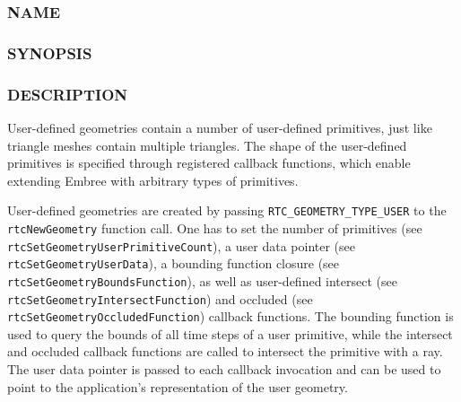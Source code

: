 \subsubsection{NAME}\label{name}

\begin{Shaded}
\begin{Highlighting}[]
\OperatorTok{{-}}
\end{Highlighting}
\end{Shaded}

\subsubsection{SYNOPSIS}\label{synopsis}

\begin{Shaded}
\begin{Highlighting}[]

\OperatorTok{=}
\OperatorTok{(}\OperatorTok{,}\OperatorTok{);}
\end{Highlighting}
\end{Shaded}

\subsubsection{DESCRIPTION}\label{description}

User-defined geometries contain a number of user-defined primitives,
just like triangle meshes contain multiple triangles. The shape of the
user-defined primitives is specified through registered callback
functions, which enable extending Embree with arbitrary types of
primitives.

User-defined geometries are created by passing
\texttt{RTC\_GEOMETRY\_TYPE\_USER} to the \texttt{rtcNewGeometry}
function call. One has to set the number of primitives (see
\texttt{rtcSetGeometryUserPrimitiveCount}), a user data pointer (see
\texttt{rtcSetGeometryUserData}), a bounding function closure (see
\texttt{rtcSetGeometryBoundsFunction}), as well as user-defined
intersect (see \texttt{rtcSetGeometryIntersectFunction}) and occluded
(see \texttt{rtcSetGeometryOccludedFunction}) callback functions. The
bounding function is used to query the bounds of all time steps of a
user primitive, while the intersect and occluded callback functions are
called to intersect the primitive with a ray. The user data pointer is
passed to each callback invocation and can be used to point to the
application's representation of the user geometry.

